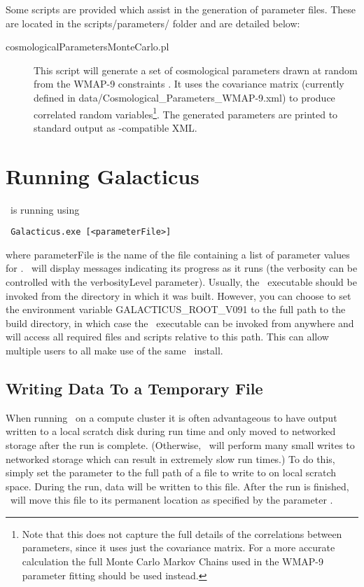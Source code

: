 Some scripts are provided which assist in the generation of parameter files. These are located in the {\normalfont \ttfamily scripts/parameters/} folder and are detailed below:
\begin{description}
\item [{\normalfont \ttfamily cosmologicalParametersMonteCarlo.pl}] This script will generate a set of cosmological parameters drawn at random from the WMAP-9 constraints \cite{hinshaw_nine-year_2012}. It uses the covariance matrix (currently defined in {\normalfont \ttfamily data/Cosmological\_Parameters\_WMAP-9.xml}) to produce correlated random variables\footnote{Note that this does not capture the full details of the correlations between parameters, since it uses just the covariance matrix. For a more accurate calculation the full Monte Carlo Markov Chains used in the WMAP-9 parameter fitting should be used instead.}. The generated parameters are printed to standard output as \glc-compatible XML.
\end{description}

\section{Running Galacticus}

\glc\ is running using
\begin{verbatim}
 Galacticus.exe [<parameterFile>]
\end{verbatim}
where {\normalfont \ttfamily parameterFile} is the name of the file containing a list of parameter values for \glc. \glc\ will display messages indicating its progress as it runs (the verbosity can be controlled with the {\normalfont \ttfamily verbosityLevel} parameter). Usually, the \glc\ executable should be invoked from the directory in which it was built. However, you can choose to set the environment variable {\normalfont \ttfamily GALACTICUS\_ROOT\_V091} to the full path to the build directory, in which case the \glc\ executable can be invoked from anywhere and will access all required files and scripts relative to this path. This can allow multiple users to all make use of the same \glc\ install.

\subsection{Writing Data To a Temporary File}

When running \glc\ on a compute cluster it is often advantageous to have output written to a local scratch disk during run time and only moved to networked storage after the run is complete. (Otherwise, \glc\ will perform many small writes to networked storage which can result in extremely slow run times.) To do this, simply set the parameter {\normalfont \ttfamily [galacticusOutputScratchFileName]} to the full path of a file to write to on local scratch space. During the run, data will be written to this file. After the run is finished, \glc\ will move this file to its permanent location as specified by the parameter {\normalfont \ttfamily [galacticusOutputFileName]}.

